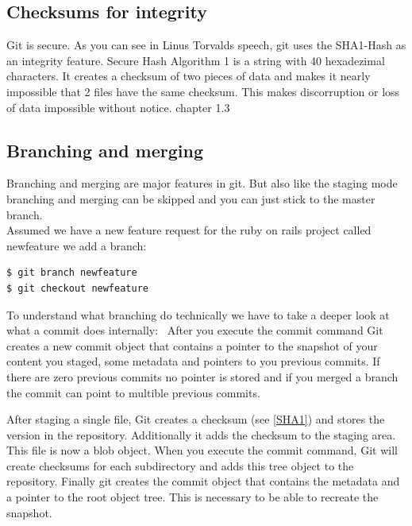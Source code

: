 \subsection{Checksums for integrity}

 \cite{googletechtalk2007}

Git is secure. As you can see in Linus Torvalds speech, git uses the SHA1-Hash
as an integrity feature. Secure Hash Algorithm 1 is a string with 40 hexadezimal
characters. It creates a checksum of two pieces of data and makes it nearly
impossible that 2 files have the same checksum. This makes discorruption or loss
of data impossible without notice. \cite{gitpro2009} chapter  1.3

\subsection {Branching and merging}

Branching and merging are major features in git. But also like the staging mode
branching and merging can be skipped and you can just stick to the master
branch. \\
Assumed we have a new feature request for the ruby on rails project called
newfeature we add a branch:
\begin{lstlisting}
$ git branch newfeature
$ git checkout newfeature
\end{lstlisting}

To understand what branching do technically we have to take a deeper look at
what a commit does internally: \
After you execute the commit command Git creates a new commit object that
contains a pointer to the snapshot of your content you staged, some metadata and
pointers to you previous commits. If there are zero previous commits no pointer
is stored and if you merged a branch the commit can point to multible previous commits.

After staging a single file, Git creates a checksum (see
\ref{SHA1}) and stores the version in the repository. Additionally it adds the
checksum to the staging area. This file is now a blob object.
When you execute the commit command, Git will create checksums for each
subdirectory and adds this tree object to the repository. Finally git creates
the commit object that contains the metadata and a pointer to the root object
tree. This is necessary to be able to recreate the snapshot.

